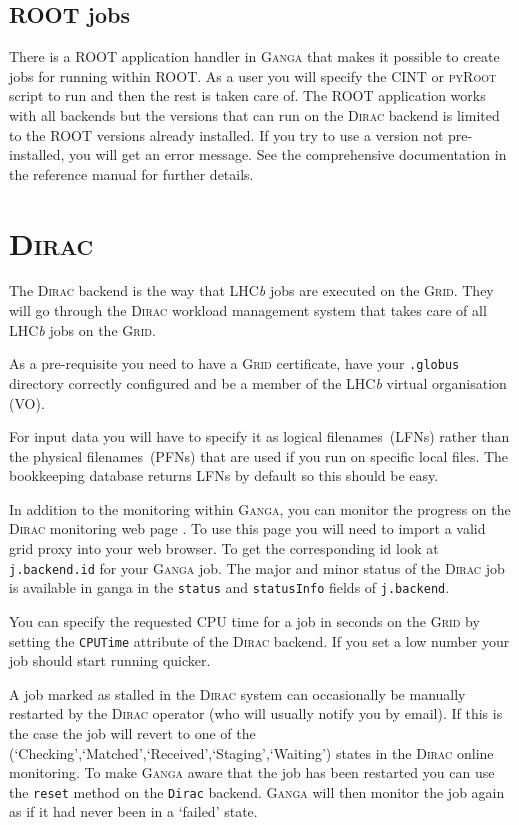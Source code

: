 \documentclass{howto}
\def\ganga {\textsc{Ganga}\xspace}
\def\root {\textsc{ROOT}\xspace}
\def\lhcb {LHC{\em b\/}\xspace}
\def\dirac {\textsc{Dirac}\xspace}
\def\grid {\textsc{Grid}\xspace}
\begin{document}
\subsection{\root jobs}
\label{sec:ROOT}
There is a \root application handler in \ganga that makes it possible to
create jobs for running within \root. As a user you will specify the
\textsc{CINT} or \textsc{pyRoot} script to run and then the rest is taken care
of. The \root application works with all backends but the versions that can
run on the \dirac backend is limited to the \root versions already
installed. If you try to use a version not pre-installed, you will get an
error message. See the comprehensive documentation in the reference manual for
further details.

\section{\dirac}
\label{sec:dirac}
The \dirac backend is the way that \lhcb jobs are executed on the \grid. They
will go through the \dirac workload management system that takes care of all
\lhcb jobs on the \grid.
\begin{notice}
  As a pre-requisite you need to have a \grid certificate, have your
  \texttt{.globus} directory correctly configured and be a member of the \lhcb
  virtual organisation (VO).
\end{notice}
For input data you will have to specify it as logical filenames~(LFNs) rather
than the physical filenames~(PFNs) that are used if you run on specific local
files. The bookkeeping database returns LFNs by default so this should be
easy.
\begin{seealso}
  In addition to the monitoring within \ganga, you can monitor the progress on
  the \dirac monitoring web page
  . To use
  this page you will need to import a valid grid proxy into your web browser. To
  get the corresponding id look at \texttt{j.backend.id} for your \ganga job.
  The major and minor status of the \dirac job is available in ganga in the
  \texttt{status} and \texttt{statusInfo} fields of \texttt{j.backend}.
\end{seealso}

You can specify the requested CPU time for a job in seconds on the \grid by
setting the \texttt{CPUTime} attribute of the \dirac backend. If you set a low
number your job should start running quicker.

\begin{notice}
A job marked as stalled in the \dirac system can occasionally be manually
restarted by the \dirac operator (who will usually notify you by email).
If this is the case the job will revert to one of the
(`Checking',`Matched',`Received',`Staging',`Waiting') states in the
\dirac online monitoring. To make \ganga aware that the job has been
restarted you can use the \texttt{reset} method on the \texttt{Dirac} backend.
\ganga will then monitor the job again as if it had never been in a `failed' state.
\end{notice}
\end{document}
